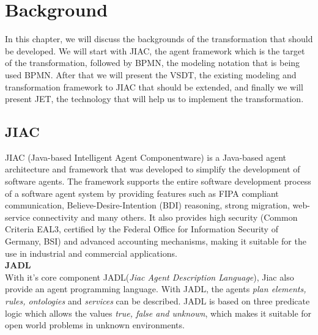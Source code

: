 \chapter{Background}
\label{chap:background}
In this chapter, we will discuss the backgrounds of the transformation that should be developed. We will start with JIAC, the agent framework which is the target of  the transformation, followed by BPMN, the modeling notation that is being used BPMN. After that we will present the VSDT, the existing modeling and transformation framework to JIAC that should be extended, and finally we will present JET, the technology that will help us to implement the transformation.

\section{JIAC}
JIAC (Java-based Intelligent Agent Componentware) is a Java-based agent architecture and framework that was developed to simplify the development of software agents\cite{JIACWEB}. The framework supports the entire software development process of a software agent system by providing features such as FIPA compliant communication, Believe-Desire-Intention (BDI) reasoning, strong migration, web-service
connectivity and many others. It also provides high security (Common Criteria EAL3,
certified by the Federal Office for Information Security of Germany, BSI) and advanced
accounting mechanisms, making it suitable for the use in industrial and
commercial applications.\\

\textbf{JADL}\\
With it's core component JADL(\textit{Jiac Agent Description Language})\cite{jadl_basic}, Jiac also provide an agent programming language. With JADL, the agents \textit{plan elements, rules, ontologies} and \textit{services} can be described. JADL is based on three predicate logic which allows the values \textit{true, false and unknown}, which makes it suitable for open world problems in unknown environments.

